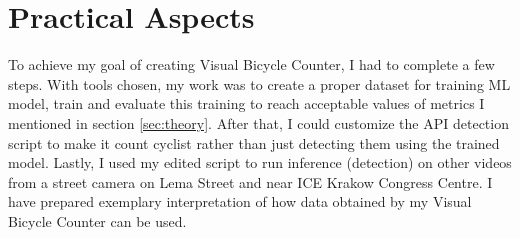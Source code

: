 \chapter{Practical Aspects}
\label{cha:practicalAspects}

To achieve my goal of creating Visual Bicycle Counter, I had to complete a few steps. With tools chosen, my work was to create a proper dataset for training ML model, train and evaluate this training to reach acceptable values of metrics I mentioned in section \ref{sec:theory}. After that, I could customize the API detection script to make it count cyclist rather than just detecting them using the trained model. Lastly, I used my edited script to run inference (detection) on other videos from a street camera on Lema Street and near ICE Krakow Congress Centre. I have prepared exemplary interpretation of how data obtained by my Visual Bicycle Counter can be used.
